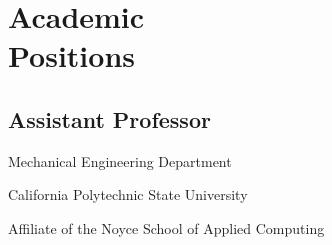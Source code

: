 \section{\texorpdfstring{Academic \\[\baselineskip] Positions}{Academic Positions}}
\hfill\vspace*{-2\baselineskip}
\subsection{Assistant Professor}

\hspace*{\sectionwidth}Mechanical Engineering Department

\hspace*{\sectionwidth}California Polytechnic State University

\hspace*{\sectionwidth}Affiliate of the Noyce School of Applied Computing
